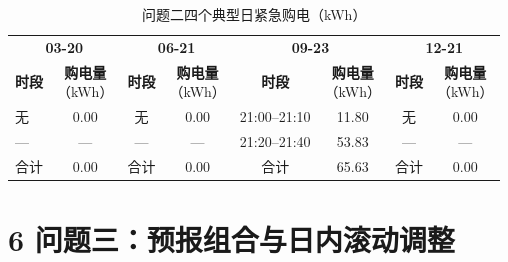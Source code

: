 \documentclass[UTF8,a4paper,zihao=-4,fontset=windows]{ctexart}
\begin{document}
\begin{table}[H]\centering
\fontsize{9.5}{12}\selectfont\setlength{\tabcolsep}{4pt}\renewcommand{\arraystretch}{1.12}
\begin{adjustbox}{max width=\linewidth}\begin{tabular}{lccccccc}\toprule
\multicolumn{2}{c}{\textbf{03-20}} & \multicolumn{2}{c}{\textbf{06-21}} & \multicolumn{2}{c}{\textbf{09-23}} & \multicolumn{2}{c}{\textbf{12-21}}\\
\cmidrule(lr){1-2} \cmidrule(lr){3-4} \cmidrule(lr){5-6} \cmidrule(lr){7-8}
\textbf{时段} & \shortstack{\textbf{购电量}\\{\normalfont （kWh）}} & \textbf{时段} & \shortstack{\textbf{购电量}\\{\normalfont （kWh）}} & \textbf{时段} & \shortstack{\textbf{购电量}\\{\normalfont （kWh）}} & \textbf{时段} & \shortstack{\textbf{购电量}\\{\normalfont （kWh）}}\\\midrule
无 & 0.00 & 无 & 0.00 & 21:00–21:10 & 11.80 & 无 & 0.00\\
— & — & — & — & 21:20–21:40 & 53.83 & — & —\\
合计 & 0.00 & 合计 & 0.00 & 合计 & 65.63 & 合计 & 0.00\\
\bottomrule\end{tabular}\end{adjustbox}
\caption{问题二四个典型日紧急购电（kWh）}
\end{table}
\section{6 问题三：预报组合与日内滚动调整}
\end{document}
